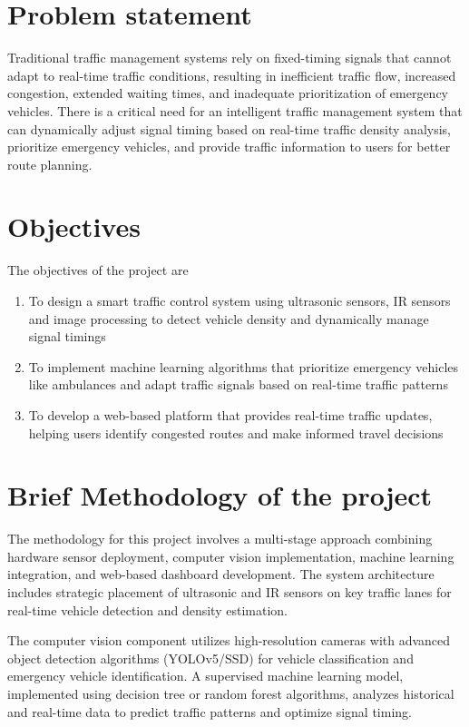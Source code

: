 \section[Problem statement]{\textbf{Problem statement}}

Traditional traffic management systems rely on fixed-timing signals that cannot adapt to real-time traffic conditions, resulting in inefficient traffic flow, increased congestion, extended waiting times, and inadequate prioritization of emergency vehicles. There is a critical need for an intelligent traffic management system that can dynamically adjust signal timing based on real-time traffic density analysis, prioritize emergency vehicles, and provide traffic information to users for better route planning.

\section[Objectives]{\textbf{Objectives}}
The objectives of the project are
\begin{enumerate}
\item To design a smart traffic control system using ultrasonic sensors, IR sensors and image processing to detect vehicle density and dynamically manage signal timings
\item To implement machine learning algorithms that prioritize emergency vehicles like ambulances and adapt traffic signals based on real-time traffic patterns
\item To develop a web-based platform that provides real-time traffic updates, helping users identify congested routes and make informed travel decisions
\end{enumerate}

\section[Brief Methodology of the project]{\textbf{Brief Methodology of the project}}

The methodology for this project involves a multi-stage approach combining hardware sensor deployment, computer vision implementation, machine learning integration, and web-based dashboard development. The system architecture includes strategic placement of ultrasonic and IR sensors on key traffic lanes for real-time vehicle detection and density estimation.

The computer vision component utilizes high-resolution cameras with advanced object detection algorithms (YOLOv5/SSD) for vehicle classification and emergency vehicle identification. A supervised machine learning model, implemented using decision tree or random forest algorithms, analyzes historical and real-time data to predict traffic patterns and optimize signal timing.

